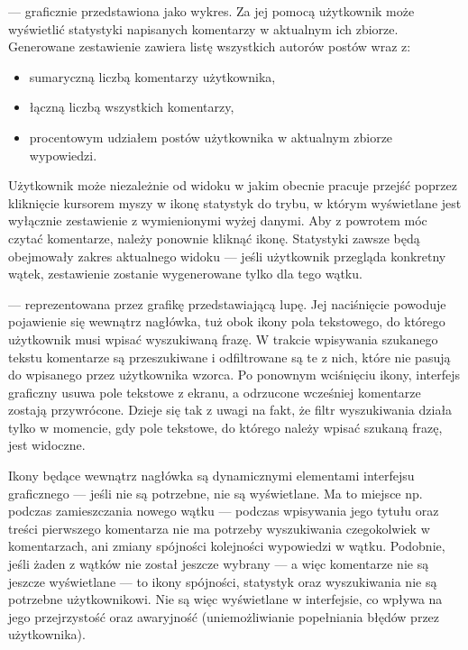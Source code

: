 \begin{description}[noitemsep]
  \item[Ikona statystyk] --- graficznie przedstawiona jako wykres. Za jej pomocą użytkownik może wyświetlić statystyki napisanych komentarzy w aktualnym ich zbiorze. Generowane zestawienie zawiera listę wszystkich autorów postów wraz z:
  \begin{itemize}[noitemsep]
    \item sumaryczną liczbą komentarzy użytkownika,
    \item łączną liczbą wszystkich komentarzy,
    \item procentowym udziałem postów użytkownika w aktualnym zbiorze wypowiedzi.
  \end{itemize}
  Użytkownik może niezależnie od widoku w jakim obecnie pracuje przejść poprzez kliknięcie kursorem myszy w ikonę statystyk do trybu, w którym wyświetlane jest wyłącznie zestawienie z wymienionymi wyżej danymi. Aby z powrotem móc czytać komentarze, należy ponownie kliknąć ikonę. Statystyki zawsze będą obejmowały zakres aktualnego widoku --- jeśli użytkownik przegląda konkretny wątek, zestawienie zostanie wygenerowane tylko dla tego wątku.
  
  \item[Ikona wyszukiwania] --- reprezentowana przez grafikę przedstawiającą lupę. Jej naciśnięcie powoduje pojawienie się wewnątrz nagłówka, tuż obok ikony pola tekstowego, do którego użytkownik musi wpisać wyszukiwaną frazę. W trakcie wpisywania szukanego tekstu komentarze są przeszukiwane i odfiltrowane są te z nich, które nie pasują do wpisanego przez użytkownika wzorca. Po ponownym wciśnięciu ikony, interfejs graficzny usuwa pole tekstowe z ekranu, a odrzucone wcześniej komentarze zostają przywrócone. Dzieje się tak z uwagi na fakt, że filtr wyszukiwania działa tylko w momencie, gdy pole tekstowe, do którego należy wpisać szukaną frazę, jest widoczne.
\end{description}

Ikony będące wewnątrz nagłówka są dynamicznymi elementami interfejsu graficznego --- jeśli nie są potrzebne, nie są wyświetlane. Ma to miejsce np. podczas zamieszczania nowego wątku --- podczas wpisywania jego tytułu oraz treści pierwszego komentarza nie ma potrzeby wyszukiwania czegokolwiek w komentarzach, ani zmiany spójności kolejności wypowiedzi w wątku. Podobnie, jeśli żaden z wątków nie został jeszcze wybrany --- a więc komentarze nie są jeszcze wyświetlane --- to ikony spójności, statystyk oraz wyszukiwania nie są potrzebne użytkownikowi. Nie są więc wyświetlane w interfejsie, co wpływa na jego przejrzystość oraz awaryjność (uniemożliwianie popełniania błędów przez użytkownika).

